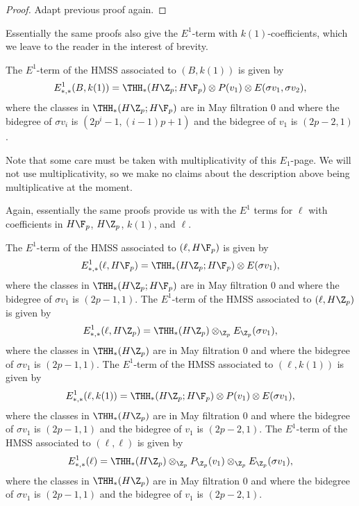 \begin{proof}
Adapt previous proof again. 
\end{proof}
Essentially the same proofs also give the $E^1$-term with $k(1)$-coefficients, which we leave to the reader in the interest of brevity. 
\begin{lem}
	The $E^1$-term of the HMSS associated to $(B,k(1))$ is given by 
	\[
	E^1_{*,*}(B,k(1)) = \THH_*(H\Z_p;H\F_p)\otimes P(v_1)\otimes E(\sigma v_1, \sigma v_2), 
	\]
	where the classes in $\THH_*(H\Z_p;H\F_p)$ are in May filtration 0 and where the bidegree of $\sigma v_i$ is $(2p^i-1, (i-1)p+1)$ and the bidegree of $v_1$ is $(2p-2,1)$.
\end{lem}
Note that some care must be taken with multiplicativity of this $E_1$-page. We will not use multiplicativity, so we make no claims about the description above being multiplicative at the moment.

Again, essentially the same proofs provide us with the $E^1$ terms for $\ell$ with coefficients in $H\F_p$, $H\Z_p$, $k(1)$, and $\ell$. 
\begin{lem}
 	The $E^1$-term of the HMSS associated to  $(\ell,H\F_p)$ is given by 
	\[
	E^1_{*,*}(\ell,H\F_p) = \THH_*(H\Z_p;H\F_p)\otimes E(\sigma v_1), 
	\]
	where the classes in $\THH_*(H\Z_p;H\F_p)$ are in May filtration 0 and where the bidegree of $\sigma v_1$ is $(2p-1, 1)$. The $E^1$-term of the HMSS associated to $(\ell,H\Z_p)$ is given by 
	\[
	E^1_{*,*}(\ell,H\Z_p) = \THH_*(H\Z_p)\otimes_{\Z_p} E_{\Z_p}(\sigma v_1), 
	\]
	where the classes in $\THH_*(H\Z_p)$ are in May filtration 0 and where the bidegree of $\sigma v_1$ is $(2p-1, 1)$. The $E^1$-term of the HMSS associated to $(\ell,k(1))$ is given by 
	\[
	E^1_{*,*}(\ell,k(1)) = \THH_*(H\Z_p;H\F_p)\otimes  P(v_1)\otimes E (\sigma v_1), 
	\]
	where the classes in $\THH_*(H\Z_p)$ are in May filtration 0 and where the bidegree of $\sigma v_1$ is $(2p-1, 1)$ and the bidegree of $v_1$ is $(2p-2,1)$. The $E^1$-term of the HMSS associated to $(\ell,\ell)$ is given by 
	\[
	E^1_{*,*}(\ell) = \THH_*(H\Z_p)\otimes_{\Z_p} P_{\Z_p}(v_1)\otimes_{\Z_p}E_{\Z_p}(\sigma v_1), 
	\]
	where the classes in $\THH_*(H\Z_p)$ are in May filtration 0 and where the bidegree of $\sigma v_1$ is $(2p-1, 1)$ and the bidegree of $v_1$ is $(2p-2,1)$. 
	\end{lem}


